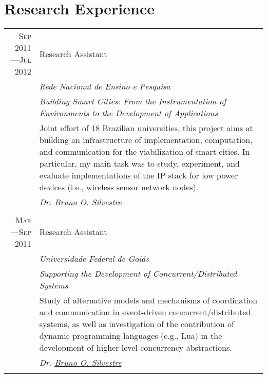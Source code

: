 \documentclass[a4paper,10pt]{article}
\begin{document}

\section{Research Experience}
\begin{tabular}{r|p{11cm}}

  \textsc{Sep 2011---Jul 2012}
  & Research Assistant \\
  &\emph{Rede Nacional de Ensino e Pesquisa}\\
  &\emph{Building Smart Cities: From the Instrumentation of Environments to the Development of Applications}\\
  &\footnotesize{Joint effort of 18 Brazilian universities, this project aims at building an infrastructure of 
    implementation, computation, and communication for the viabilization of smart cities. In particular, my main
    task was to study, experiment, and evaluate implementations of the IP stack for low power devices (i.e., 
    wireless sensor network nodes).}\\
  &\emph{Dr. \href{http://inf.ufg.br/~brunoos/}{Bruno O. Silvestre}}
  \\\multicolumn{2}{c}{} \\

  \textsc{Mar---Sep 2011}
  & Research Assistant \\
  &\emph{Universidade Federal de Goiás}\\
  &\emph{Supporting the Development of Concurrent/Distributed Systems}\\
  &\indent \footnotesize{Study of alternative models and mechanisms of coordination and communication in event-driven
    concurrent/distributed systems, as well as investigation of the contribution of dynamic programming 
    languages (e.g., Lua) in the development of higher-level concurrency abstractions.}\\
  &\emph{Dr. \href{http://inf.ufg.br/~brunoos/}{Bruno O. Silvestre}}
  \\\multicolumn{2}{c}{} \\

\end{tabular}

\nocite{salazar:1}

\renewcommand\refname{Publications} 



\end{document}
